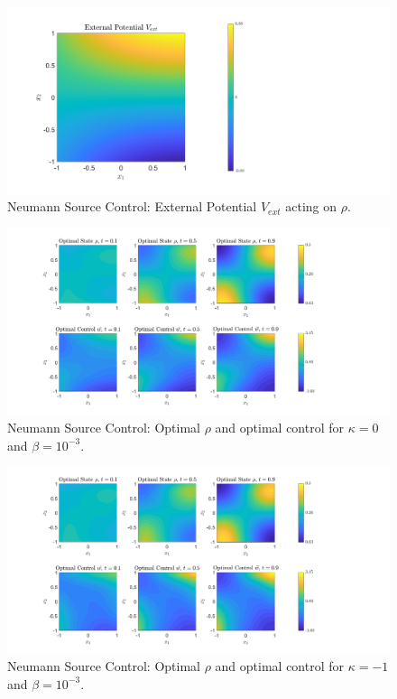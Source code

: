 \documentclass[11pt, a4paper]{article}
\theoremstyle{definition}
\begin{document}
	\begin{figure}[h]
		\centering
		\includegraphics[scale=0.35]{SCEx1Vext.png}
		\caption{Neumann Source Control: External Potential $V_{ext}$ acting on $\rho$.} 
		\label{F1V}
	\end{figure}
	\begin{figure}[h]
		\centering
		\includegraphics[scale=0.35]{SCEx1k0.png}
		\caption{Neumann Source Control: Optimal $\rho$ and optimal control for $\kappa = 0$ and $\beta = 10^{-3}$.} 
		\label{F1a}
	\end{figure}
	\begin{figure}[h]
		\centering
		\includegraphics[scale=0.35]{SCEx1kn1.png}
		\caption{Neumann Source Control: Optimal $\rho$ and optimal control for $\kappa = -1$ and $\beta = 10^{-3}$.} 
		\label{F1b}
	\end{figure}
\end{document}
